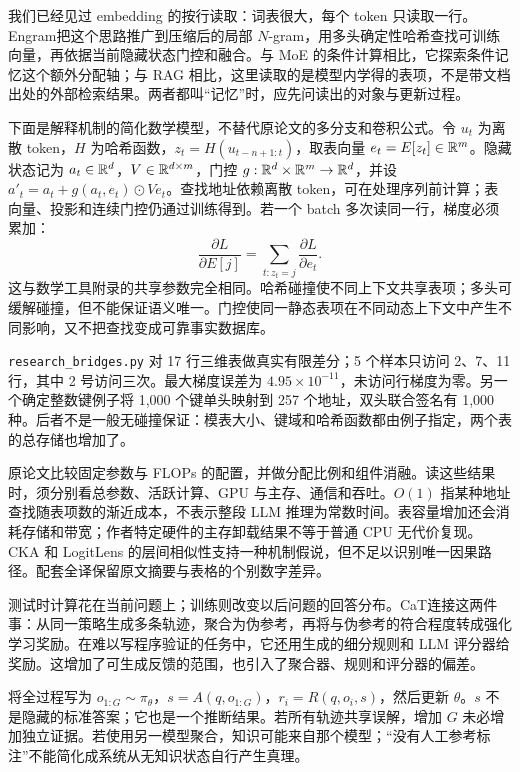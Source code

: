 \label{sec:engram-bridge}
我们已经见过 embedding 的按行读取：词表很大，每个 token 只读取一行。Engram\cite{engram}把这个思路推广到压缩后的局部 $N$-gram，用多头确定性哈希查找可训练向量，再依据当前隐藏状态门控和融合。与 MoE 的条件计算相比，它探索条件记忆这个额外分配轴；与 RAG 相比，这里读取的是模型内学得的表项，不是带文档出处的外部检索结果。两者都叫“记忆”时，应先问读出的对象与更新过程。

下面是解释机制的简化数学模型，不替代原论文的多分支和卷积公式。令 $u_t$ 为离散 token，$H$ 为哈希函数，$z_t=H(u_{t-n+1:t})$，取表向量 $e_t=E[z_t]\in\mathbb R^m$。隐藏状态记为 $a_t\in\mathbb R^d$，$V\in\mathbb R^{d\times m}$，门控 $g:\mathbb R^d\times\mathbb R^m\to\mathbb R^d$，并设 $a'_t=a_t+g(a_t,e_t)\odot Ve_t$。查找地址依赖离散 token，可在处理序列前计算；表向量、投影和连续门控仍通过训练得到。若一个 batch 多次读同一行，梯度必须累加：
\[
\frac{\partial L}{\partial E[j]}=\sum_{t:z_t=j}\frac{\partial L}{\partial e_t}.
\]
这与数学工具附录的共享参数完全相同。哈希碰撞使不同上下文共享表项；多头可缓解碰撞，但不能保证语义唯一。门控使同一静态表项在不同动态上下文中产生不同影响，又不把查找变成可靠事实数据库。

\texttt{research\_bridges.py} 对 17 行三维表做真实有限差分；5 个样本只访问 2、7、11 行，其中 2 号访问三次。最大梯度误差为 $4.95\times10^{-11}$，未访问行梯度为零。另一个确定整数键例子将 1,000 个键单头映射到 257 个地址，双头联合签名有 1,000 种。后者不是一般无碰撞保证：模表大小、键域和哈希函数都由例子指定，两个表的总存储也增加了。

原论文比较固定参数与 FLOPs 的配置，并做分配比例和组件消融。读这些结果时，须分别看总参数、活跃计算、GPU 与主存、通信和吞吐。$O(1)$ 指某种地址查找随表项数的渐近成本，不表示整段 LLM 推理为常数时间。表容量增加还会消耗存储和带宽；作者特定硬件的主存卸载结果不等于普通 CPU 无代价复现。CKA 和 LogitLens 的层间相似性支持一种机制假说，但不足以识别唯一因果路径。配套全译保留原文摘要与表格的个别数字差异。

\label{sec:cat-bridge}
测试时计算花在当前问题上；训练则改变以后问题的回答分布。CaT\cite{cat}连接这两件事：从同一策略生成多条轨迹，聚合为伪参考，再将与伪参考的符合程度转成强化学习奖励。在难以写程序验证的任务中，它还用生成的细分规则和 LLM 评分器给奖励。这增加了可生成反馈的范围，也引入了聚合器、规则和评分器的偏差。

将全过程写为 $o_{1:G}\sim\pi_\theta$，$s=A(q,o_{1:G})$，$r_i=R(q,o_i,s)$，然后更新 $\theta$。$s$ 不是隐藏的标准答案；它也是一个推断结果。若所有轨迹共享误解，增加 $G$ 未必增加独立证据。若使用另一模型聚合，知识可能来自那个模型；“没有人工参考标注”不能简化成系统从无知识状态自行产生真理。

